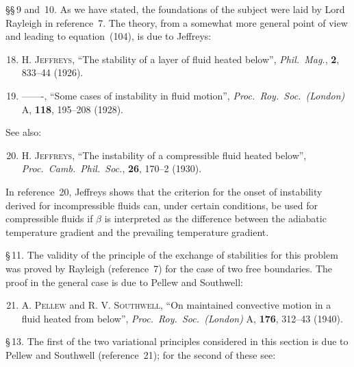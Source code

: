 \noindent \S\S\,9 and~10. As we have stated, the foundations of the subject were laid by Lord
Rayleigh in reference~7. The theory, from a somewhat more general point of
view and leading to equation~(104), is due to Jeffreys:

\begin{enumerate}
\setcounter{enumi}{17}

\item \textsc{H. Jeffreys}, ``The stability of a layer of fluid heated below'',
  \textit{Phil.\ Mag.}, \textbf{2}, 833--44 (1926).

\item -------, ``Some cases of instability in fluid motion'',
  \textit{Proc.\ Roy.\ Soc.\ (London)} A, \textbf{118}, 195--208 (1928).

\end{enumerate}

\noindent See also:

\begin{enumerate}
\setcounter{enumi}{19}

\item \textsc{H. Jeffreys}, ``The instability of a compressible fluid heated below'',
  \textit{Proc.\ Camb.\ Phil.\ Soc.}, \textbf{26}, 170--2 (1930).

\end{enumerate}

\noindent In reference~20, Jeffreys shows that the criterion for the onset of instability
derived for incompressible fluids can, under certain conditions, be used for
compressible fluids if $\beta$ is interpreted as the difference between the adiabatic
temperature gradient and the prevailing temperature gradient.

\noindent \S\,11. The validity of the principle of the exchange of stabilities for this problem
was proved by Rayleigh (reference~7) for the case of two free boundaries. The
proof in the general case is due to Pellew and Southwell:

\begin{enumerate}
\setcounter{enumi}{20}

\item \textsc{A. Pellew} and \textsc{R. V. Southwell}, ``On maintained convective motion in
  a fluid heated from below'', \textit{Proc.\ Roy.\ Soc.\ (London)} A, \textbf{176},
  312--43 (1940).

\end{enumerate}

\noindent \S\,13. The first of the two variational principles considered in this section is due
to Pellew and Southwell (reference~21); for the second of these see:

